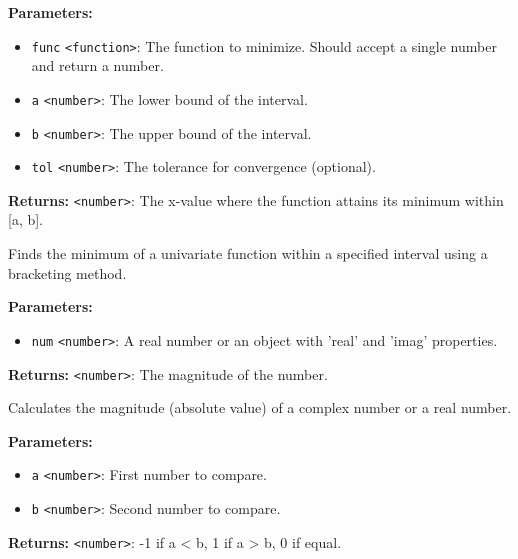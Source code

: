 \documentclass[12pt,a4paper]{article}
\begin{document}
\noindent \textbf{Parameters:}
\begin{itemize}
  \item \texttt{func} \texttt{<function>}: The function to minimize. Should accept a single number and return a number.
  \item \texttt{a} \texttt{<number>}: The lower bound of the interval.
  \item \texttt{b} \texttt{<number>}: The upper bound of the interval.
  \item \texttt{tol} \texttt{<number>}: The tolerance for convergence (optional).
\end{itemize}

\noindent \textbf{Returns:} \texttt{<number>}: The x-value where the function attains its minimum within [a, b].

\noindent Finds the minimum of a univariate function within a specified interval using a bracketing method.

\vspace{5mm}
\noindent {}


\noindent \textbf{Parameters:}
\begin{itemize}
  \item \texttt{num} \texttt{<number>}: A real number or an object with 'real' and 'imag' properties.
\end{itemize}

\noindent \textbf{Returns:} \texttt{<number>}: The magnitude of the number.

\noindent Calculates the magnitude (absolute value) of a complex number or a real number.

\vspace{5mm}
\noindent {}


\noindent \textbf{Parameters:}
\begin{itemize}
  \item \texttt{a} \texttt{<number>}: First number to compare.
  \item \texttt{b} \texttt{<number>}: Second number to compare.
\end{itemize}

\noindent \textbf{Returns:} \texttt{<number>}: -1 if a < b, 1 if a > b, 0 if equal.
\end{document}
